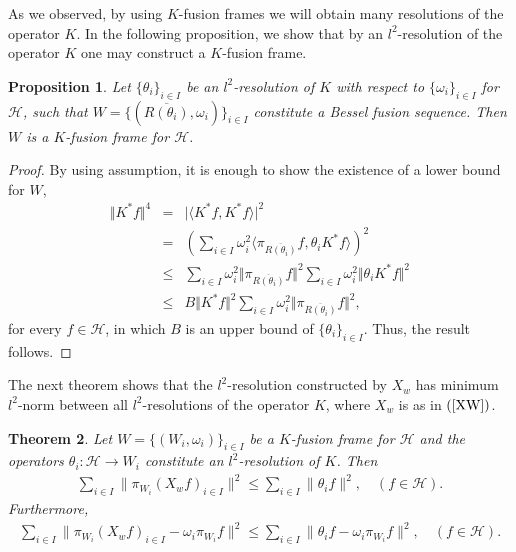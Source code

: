 \documentclass{birkjour}
\newtheorem{thm}{Theorem}[section]
\newtheorem{prop}[thm]{Proposition}
\theoremstyle{definition}
\theoremstyle{remark}
\numberwithin{equation}{section}
\begin{document}
As we observed,  by using $K$-fusion frames we will obtain many resolutions  of the operator $K$. In the following  proposition, we show  that by an  $l^{2}$-resolution of  the operator $K$ one may construct a $K$-fusion frame.
\begin{prop}
Let $\{\theta_{i}\}_{i\in I}$ be an $l^{2}$-resolution of  $K$ with respect to $\{\omega_{i}\}_{i\in I}$ for $\mathcal{H}$, such that   $W=\{(\overline{R(\theta_{i})}, \omega_{i})\}_{i\in I}$ constitute a Bessel fusion sequence. Then $W$ is a  $K$-fusion frame for $\mathcal{H}$.
\end{prop}
\begin{proof}
By using assumption, it is enough to show the existence of a lower bound for $W$,
\begin{eqnarray*}
\Vert K^{*}f\Vert^{4} &=& \vert \langle K^{*}f, K^{*}f\rangle\vert^{2}\\
&=& \left( \sum_{i\in I}\omega_{i}^{2}\langle \pi_{\overline{R(\theta_{i})}}f, \theta_{i}K^{*}f\rangle \right)^{2}\\
&\leq& \sum_{i\in I}\omega_{i}^{2}\Vert \pi_{\overline{R(\theta_{i})}}f\Vert^{2}  \sum_{i\in I}\omega_{i}^{2}\Vert \theta_{i}K^{*}f\Vert^{2} \\
&\leq& B\Vert K^{*}f\Vert^{2}\sum_{i\in I}\omega_{i}^{2}\Vert \pi_{\overline{R(\theta_{i})}}f\Vert^{2},
\end{eqnarray*}
 for every $f\in \mathcal{H}$, in which $B$ is an upper bound of $\{\theta_{i}\}_{i\in I}$. Thus, the result follows.
\end{proof}
The next theorem shows that the $l^{2}$-resolution constructed by $X_{w}$  has minimum $l^{2}$-norm between all $l^{2}$-resolutions of the operator $K$, where $X_{w}$ is as in $(\ref{XW})$.
\begin{thm}\label{minimal norm}
Let $W=\lbrace
(W_{i},\omega_{i})\rbrace_{i\in I}$ be a $K$-fusion frame for $\mathcal{H}$ and the operators $\theta_{i}: \mathcal{H}\rightarrow W_{i}$ constitute an $l^{2}$-resolution of  $K$. Then
\begin{eqnarray*}
\sum_{i\in I}\|\pi_{W_{i}}(X_{w}f)_{i\in I}\|^2\leq  \sum_{i\in
I}\|\theta_{i}f\|^2, \quad (f\in \mathcal{H}).
\end{eqnarray*}
Furthermore,
\begin{eqnarray*}
\sum_{i\in I}\|\pi_{W_{i}}(X_{w}f)_{i\in I} - \omega_{i}\pi_{W_i}f\|^2\leq  \sum_{i\in
I}\|\theta_{i}f - \omega_{i}\pi_{W_i}f\|^2, \quad (f\in \mathcal{H}).
\end{eqnarray*}
\end{thm}
\end{document}
